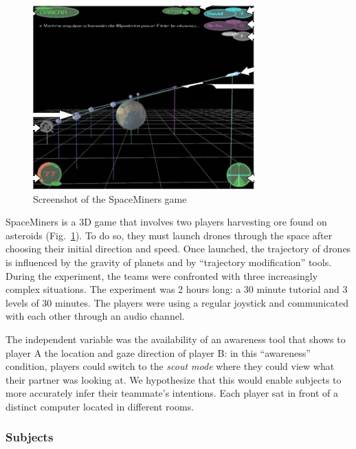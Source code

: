 \documentclass[natbib]{svjour3}
\newcommand{\A}{A\xspace}
\newcommand{\B}{B\xspace}
\begin{document}
\begin{figure}
        \centering
        \includegraphics[width=\textwidth]{image4.png}
        \caption{Screenshot of the {\sc SpaceMiners} game}
        \label{study1:spaceminer}
\end{figure}


{\sc SpaceMiners} is a 3D game that involves two players harvesting ore
found on asteroids (Fig.~\ref{study1:spaceminer}). To do so, they must launch
drones through the space after choosing their initial direction and speed. Once
launched, the trajectory of drones is influenced by the gravity of planets
and by ``trajectory modification'' tools. During the experiment, the teams were
confronted with three increasingly complex situations. The experiment was 2
hours long: a 30 minute tutorial and 3 levels of 30 minutes. The players were using
a regular joystick and communicated with each other through an audio channel.

The independent variable was the availability of an awareness tool that shows to
player \A  the location and gaze direction of player \B: in this ``awareness''
condition, players could switch to the \emph{scout mode} where they could view
what their partner was looking at. We hypothesize that this would enable
subjects to more accurately infer their teammate's intentions. Each player sat
in front of a distinct computer located in different rooms. 

\subsubsection*{Subjects}
\end{document}
